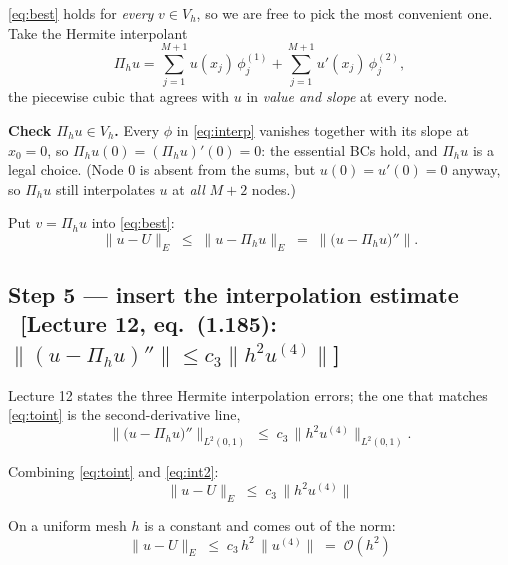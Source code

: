 \documentclass[11pt]{article}
\newcommand{\norm}[1]{\lVert #1\rVert}
\newcommand{\src}[1]{{\small\color{black!55}\textsf{[#1]}}}
\begin{document}
\begin{steps}
\item \eqref{eq:best} holds for \emph{every} $v\in V_{h}$, so we are free to
      pick the most convenient one.  Take the Hermite interpolant
\begin{equation}\label{eq:interp}
  \Pi_{h}u=\sum_{j=1}^{M+1}u(x_{j})\,\phi^{(1)}_{j}
          +\sum_{j=1}^{M+1}u'(x_{j})\,\phi^{(2)}_{j},
\end{equation}
      the piecewise cubic that agrees with $u$ in \emph{value and slope} at
      every node.
\item \textbf{Check $\Pi_{h}u\in V_{h}$.}  Every $\phi$ in \eqref{eq:interp}
      vanishes together with its slope at $x_{0}=0$, so
      $\Pi_{h}u(0)=(\Pi_{h}u)'(0)=0$: the essential BCs hold, and $\Pi_{h}u$ is
      a legal choice.  (Node $0$ is absent from the sums, but $u(0)=u'(0)=0$
      anyway, so $\Pi_{h}u$ still interpolates $u$ at \emph{all} $M+2$ nodes.)
\item Put $v=\Pi_{h}u$ into \eqref{eq:best}:
\begin{equation}\label{eq:toint}
  \norm{u-U}_{E}\;\le\;\norm{u-\Pi_{h}u}_{E}
  \;=\;\norm{\bigl(u-\Pi_{h}u\bigr)''} .
\end{equation}
\end{steps}

\subsection*{Step 5 --- insert the interpolation estimate
  \ \src{Lecture 12, eq.~(1.185):
         $\norm{(u-\Pi_h u)''}\le c_{3}\norm{h^{2}u^{(4)}}$}}

\begin{steps}
\item Lecture 12 states the three Hermite interpolation errors; the one that
      matches \eqref{eq:toint} is the second-derivative line,
\begin{equation}\label{eq:int2}
  \norm{\bigl(u-\Pi_{h}u\bigr)''}_{L^{2}(0,1)}
  \;\le\;c_{3}\,\norm{h^{2}u^{(4)}}_{L^{2}(0,1)} .
\end{equation}
\item Combining \eqref{eq:toint} and \eqref{eq:int2}:
\begin{equation}\label{eq:result}
  \boxed{\;\norm{u-U}_{E}\;\le\;c_{3}\,\norm{h^{2}u^{(4)}}\;}
\end{equation}
\item On a uniform mesh $h$ is a constant and comes out of the norm:
\begin{equation}\label{eq:resultuni}
  \boxed{\;\norm{u-U}_{E}\;\le\;c_{3}\,h^{2}\,\norm{u^{(4)}}
  \;=\;\mathcal{O}(h^{2})\;}
\end{equation}
\end{steps}
\end{document}
